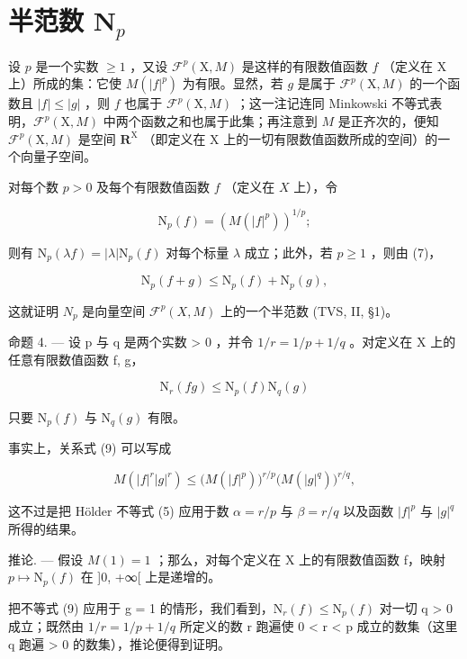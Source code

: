 \section{\texorpdfstring{半范数 \(\mathbf{N}_p\)}{半范数 N sub p}}

设 \(p\) 是一个实数 \(\geqslant 1\) ，又设 \(\mathcal{F}^p(\mathrm{X},M)\) 是这样的有限数值函数 \(f\) （定义在 \(\mathrm{X}\) 上）所成的集：它使 \(M(|f|^p)\) 为有限。显然，若 \(g\) 是属于 \(\mathcal{F}^p(\mathrm{X},M)\) 的一个函数且 \(|f| \leqslant |g|\) ，则 \(f\) 也属于 \(\mathcal{F}^p(\mathrm{X},M)\) ；这一注记连同 Minkowski 不等式表明，\(\mathcal{F}^p(\mathrm{X},M)\) 中两个函数之和也属于此集；再注意到 \(M\) 是正齐次的，便知 \(\mathcal{F}^p(\mathrm{X},M)\) 是空间 \(\mathbf{R}^{\mathrm{X}}\) （即定义在 \(\mathrm{X}\) 上的一切有限数值函数所成的空间）的一个向量子空间。

对每个数 \(p > 0\) 及每个有限数值函数 \(f\) （定义在 \(X\) 上），令

\[
\mathrm{N} _ {p} (f) = \left(M (| f | ^ {p})\right) ^ {1 / p};
\]

则有 \(\mathrm{N}_p(\lambda f) = |\lambda |\mathrm{N}_p(f)\) 对每个标量 \(\lambda\) 成立；此外，若 \(p \geqslant 1\) ，则由 (7)，

\[
\mathrm{N} _ {p} (f + g) \leqslant \mathrm{N} _ {p} (f) + \mathrm{N} _ {p} (g),\tag{8}
\]

这就证明 \(N_{p}\) 是向量空间 \(\mathcal{F}^{p}(X,M)\) 上的一个半范数 (TVS, II, §1)。

命题 4. --- 设 p 与 q 是两个实数 \textgreater{} 0 ，并令 \(1/r = 1/p + 1/q\) 。对定义在 X 上的任意有限数值函数 f, g，

\[
\mathrm{N} _ {r} (f g) \leqslant \mathrm{N} _ {p} (f) \mathrm{N} _ {q} (g)\tag{9}
\]

只要 \(\mathrm{N}_p(f)\) 与 \(\mathrm{N}_q(g)\) 有限。

事实上，关系式 (9) 可以写成

\[
M (| f | ^ {r} | g | ^ {r}) \leqslant \bigl (M (| f | ^ {p}) \bigr) ^ {r / p} \bigl (M (| g | ^ {q}) \bigr) ^ {r / q},
\]

这不过是把 Hölder 不等式 (5) 应用于数 \(\alpha = r / p\) 与 \(\beta = r / q\) 以及函数 \(|f|^p\) 与 \(|g|^q\) 所得的结果。

推论. --- 假设 \(M(1) = 1\) ；那么，对每个定义在 X 上的有限数值函数 f，映射 \(p \mapsto \mathrm{N}_{p}(f)\) 在 {]}0, +∞{[} 上是递增的。

把不等式 (9) 应用于 g = 1 的情形，我们看到，\(\mathrm{N}_{r}(f) \leqslant \mathrm{N}_{p}(f)\) 对一切 q \textgreater{} 0 成立；既然由 \(1/r = 1/p + 1/q\) 所定义的数 r 跑遍使 0 < r < p 成立的数集（这里 q 跑遍 \textgreater{} 0 的数集），推论便得到证明。

